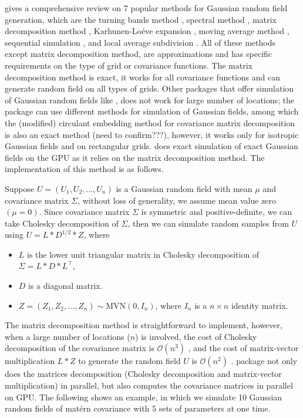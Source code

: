 \documentclass[article,nojss]{jss}\usepackage[]{graphicx}\usepackage[]{color}
\begin{document}
\cite{LiuandLi2019} gives a comprehensive review on 7 popular methods for Gaussian random field generation, which are the turning bands method \citep{matheron_1973}, spectral method \citep{Meja1974OnTS,1972JSV}, matrix decomposition method \citep{davis1987}, Karhunen-Lo\'eve expansion \citep{LoeveM:1978}, moving average method \citep{journel1974, oliver1995moving}, sequential simulation \citep{johnson1987multivariate, gomez1993joint, pebesma2004multivariable}, and local average subdivision \citep{fenton1990simulation}. All of these methods except matrix decomposition method, are approximations and has specific requirements on the type of grid or covariance functions. The matrix decomposition method is exact, it works for all covariance functions and can generate random field on all types of grids. Other  packages that offer simulation of Gaussian random fields like  \citep{geoR2001}, does not work for large number of locations; the  \citep{RandomFields2015,RandomFields2020} package can use different methods for simulation of Gaussian fields, among which the (modified) circulant embedding method \citep{Dietrich1997FastAE} for covariance matrix decomposition is also an exact method (need to confirm???), however, it works only for isotropic Gaussian fields and on rectangular grids.  does exact simulation of exact Gaussian fields on the GPU as it relies on the matrix decomposition method. The implementation of this method is as follows.


Suppose $U=(U_1, U_2, \dots, U_n)$ is a Gaussian random field with mean $\mu$ and covariance matrix $\Sigma$, without loss of generality, we assume mean value zero $(\mu = 0)$. Since covariance matrix $\Sigma$ is symmetric and positive-definite, we can take Cholesky decomposition of $\Sigma$, then we can simulate random samples from $U$ using $U=L*D^{1/2}*Z$, where 
\begin{itemize}
\item $L$ is the lower unit triangular matrix in Cholesky decomposition of $\Sigma = L*D*L^\top$,
\item $D$ is a diagonal matrix.
\item $Z=(Z_1, Z_2, \dots, Z_n) \sim \text{MVN}(0,I_n)$, where $I_n$ is a $n \times n$ identity matrix.
\end{itemize}
The matrix decomposition method is straightforward to implement, however, when a large number of locations ($n$) is involved, the cost of Cholesky decomposition of the covariance matrix is $\mathcal{O}(n^3)$ \citep{LiuandLi2019},  and the cost of matrix-vector multiplication $L*Z$ to generate the random field $U$ is $\mathcal{O}(n^2)$ \citep{LiuandLi2019}.   package not only does the matrices decomposition (Cholesky decomposition and matrix-vector multiplication) in parallel, but also computes the covariance matrices in parallel on GPU. The following shows an example, in which we simulate 10 Gaussian random fields of mat\'ern covariance with 5 sets of parameters at one time. %
\end{document}
